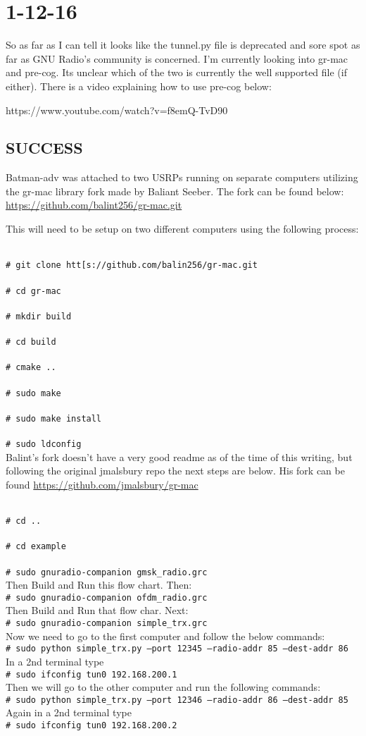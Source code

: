 \documentclass{article}
\newcommand{\shellcmd}[1]{\\\indent\indent\texttt{\footnotesize\# #1}\\}
\begin{document}
{	\section{1-12-16}

	So as far as I can tell it looks like the tunnel.py file is deprecated and sore spot as far as GNU Radio's community is concerned. I'm currently looking into gr-mac and pre-cog. Its unclear which of the two is currently the well supported file (if either). There is a video explaining how to use pre-cog below:

		https://www.youtube.com/watch?v=f8emQ-TvD90

	\subsection{SUCCESS}

	Batman-adv was attached to two USRPs running on separate computers utilizing the gr-mac library fork made by Baliant Seeber. The fork can be found below:
	\href{Link to Github Repo}{https://github.com/balint256/gr-mac.git}

	This will need to be setup on two different computers using the following process:

	\shellcmd{git clone htt[s://github.com/balin256/gr-mac.git}
	\shellcmd{cd gr-mac}
	\shellcmd{mkdir build}
	\shellcmd{cd build}
	\shellcmd{cmake ..}
	\shellcmd{sudo make}
	\shellcmd{sudo make install}
	\shellcmd{sudo ldconfig}

	Balint's fork doesn't have a very good readme as of the time of this writing, but following the original jmalsbury repo the next steps are below. His fork can be found
	\href{here}{https://github.com/jmalsbury/gr-mac}

	\shellcmd{cd ..}
	\shellcmd{cd example} 
	\shellcmd{sudo gnuradio-companion gmsk\_radio.grc}
	Then Build and Run this flow chart. Then:
	\shellcmd{sudo gnuradio-companion ofdm\_radio.grc}
	Then Build and Run that flow char. Next:
	\shellcmd{sudo gnuradio-companion simple\_trx.grc}
	
	Now we need to go to the first computer and follow the below commands:
	\shellcmd{sudo python simple\_trx.py --port 12345 --radio-addr 85 --dest-addr 86}
	In a 2nd terminal type 
	\shellcmd{sudo ifconfig tun0 192.168.200.1}

	Then we will go to the other computer and run the following commands:
	\shellcmd{sudo python simple\_trx.py --port 12346 --radio-addr 86 --dest-addr 85}
	Again in a 2nd terminal type
	\shellcmd{sudo ifconfig tun0 192.168.200.2}

}
\end{document}
